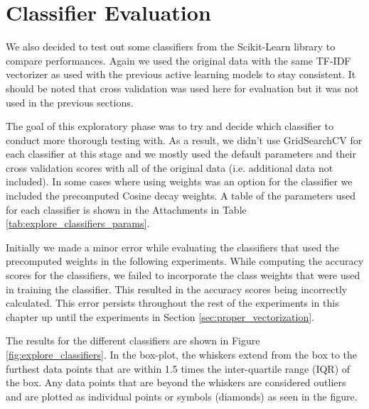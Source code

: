 \section{Classifier Evaluation}

We also decided to test out some classifiers from the Scikit-Learn library to compare performances. Again we used the original data with the same TF-IDF vectorizer as used with the previous active learning models to stay consistent. It should be noted that cross validation was used here for evaluation but it was not used in the previous sections.

The goal of this exploratory phase was to try and decide which classifier to conduct more thorough testing with. As a result, we didn't use GridSearchCV for each classifier at this stage and we mostly used the default parameters and their cross validation scores with all of the original data (i.e. additional data not included). In some cases where using weights was an option for the classifier we included the precomputed Cosine decay weights. A table of the parameters used for each classifier is shown in the Attachments in Table \ref{tab:explore_classifiers_params}.

Initially we made a minor error while evaluating the classifiers that used the precomputed weights in the following experiments. While computing the accuracy scores for the classifiers, we failed to incorporate the class weights that were used in training the classifier. This resulted in the accuracy scores being incorrectly calculated. This error persists throughout the rest of the experiments in this chapter up until the experiments in Section \ref{sec:proper_vectorization}.

The results for the different classifiers are shown in Figure \ref{fig:explore_classifiers}. In the box-plot, the whiskers extend from the box to the furthest data points that are within 1.5 times the inter-quartile range (IQR) of the box. Any data points that are beyond the whiskers are considered outliers and are plotted as individual points or symbols (diamonds) as seen in the figure.

